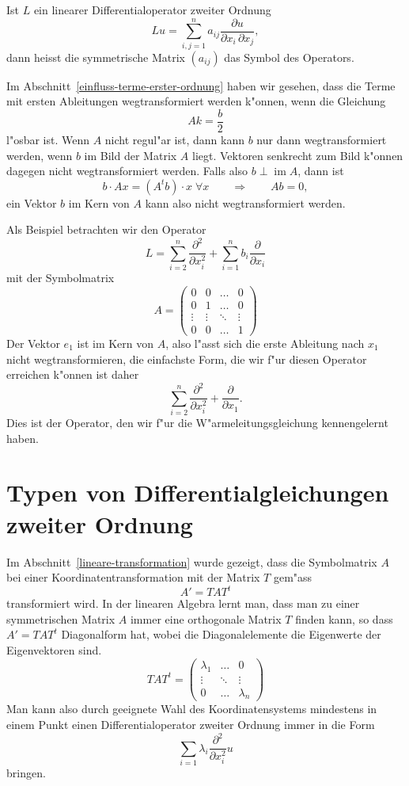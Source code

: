 \begin{definition}Ist $L$ ein linearer Differentialoperator zweiter Ordnung
\[
Lu=\sum_{i,j=1}^na_{ij}\frac{\partial u}{\partial x_i\,\partial x_j},
\]
dann heisst die symmetrische Matrix
$(a_{ij})$ das Symbol des Operators.
\end{definition}

Im Abschnitt~\ref{einfluss-terme-erster-ordnung} haben wir gesehen,
dass die Terme mit ersten Ableitungen wegtransformiert werden k"onnen,
wenn die Gleichung 
\[
Ak=\frac{b}2
\]
l"osbar ist.
Wenn $A$ nicht regul"ar ist, dann kann $b$ nur dann wegtransformiert werden,
wenn $b$ im Bild der Matrix $A$ liegt.
Vektoren senkrecht zum Bild k"onnen dagegen nicht wegtransformiert werden.
Falls also $b\perp \operatorname{im} A$, dann ist
\[
b\cdot Ax=(A^tb)\cdot x\;\forall x
\qquad\Rightarrow\qquad
Ab=0,
\]
ein Vektor $b$ im Kern von $A$ kann also nicht wegtransformiert werden.

\begin{beispiel}
Als Beispiel betrachten wir den Operator 
\[
L
=
\sum_{i=2}^n\frac{\partial^2}{\partial x_i^2}
+
\sum_{i=1}^nb_i\frac{\partial}{\partial x_i}
\]
mit der Symbolmatrix
\[
A=\begin{pmatrix}
      0&      0& \dots&0\\
      0&      1& \dots&0\\
\vdots &\vdots &\ddots&\vdots\\
      0&      0&\dots &1
\end{pmatrix}
\]
Der Vektor $e_1$ ist im Kern von $A$, also l"asst sich die erste
Ableitung nach $x_1$ nicht wegtransformieren, die einfachste
Form, die wir f"ur diesen Operator erreichen k"onnen ist daher
\[
\sum_{i=2}^n\frac{\partial^2}{\partial x_i^2}
+
\frac{\partial}{\partial x_1}.
\]
Dies ist der Operator, den wir f"ur die W"armeleitungsgleichung
kennengelernt haben.
\end{beispiel}

\section{Typen von Differentialgleichungen zweiter Ordnung}
Im Abschnitt~\ref{lineare-transformation} wurde gezeigt, dass die Symbolmatrix
$A$ bei einer Koordinatentransformation mit der Matrix $T$ gem"ass
\[
A'=TAT^t 
\]
transformiert wird.
In der linearen Algebra lernt man, dass man zu einer symmetrischen
Matrix $A$ immer eine orthogonale Matrix $T$ finden kann, so dass
$A'=TAT^t$ Diagonalform hat, wobei die Diagonalelemente die
Eigenwerte der Eigenvektoren sind.
\[
TAT^t
=
\begin{pmatrix}\lambda_1&\dots&0\\
\vdots&\ddots&\vdots\\
0&\dots&\lambda_n
\end{pmatrix}
\]
Man kann also durch geeignete Wahl des Koordinatensystems mindestens in
einem Punkt einen Differentialoperator zweiter Ordnung immer in die
Form
\[
\sum_{i=1}\lambda_i\frac{\partial^2}{\partial x_i^2}u
\]
bringen.

